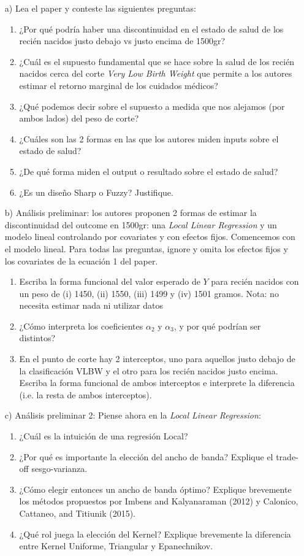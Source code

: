 \documentclass{article}
\begin{document}
\begin{enumerate}
\item[a)] Lea el paper y conteste las siguientes preguntas:
	\begin{enumerate}
	\item ¿Por qué podría haber una discontinuidad en el estado de salud de los recién nacidos justo debajo vs justo encima de 1500gr?
	\item ¿Cuál es el supuesto fundamental que se hace sobre la salud de los recién nacidos cerca del corte \textit{Very Low Birth Weight} que permite a los autores estimar el retorno marginal de los cuidados médicos?
	\item ¿Qué podemos decir sobre el supuesto a medida que nos alejamos (por ambos lados) del peso de corte?
	\item ¿Cuáles son las 2 formas en las que los autores miden inputs sobre el estado de salud?
	\item ¿De qué forma miden el output o resultado sobre el estado de salud?
	\item ¿Es un diseño Sharp o Fuzzy? Justifique. 
	\end{enumerate}
\item[b)] Análisis preliminar: los autores proponen 2 formas de estimar la discontinuidad del outcome en 1500gr: una \textit{Local Linear Regression} y un modelo lineal controlando por covariates y con efectos fijos. Comencemos con el modelo lineal. Para todas las preguntas, ignore y omita los efectos fijos y los covariates de la ecuación 1 del paper.
	\begin{enumerate}
	\item Escriba la forma funcional del valor esperado de $Y$ para recién nacidos con un peso de (i) 1450, (ii) 1550, (iii) 1499 y (iv) 1501 gramos. Nota: no necesita estimar nada ni utilizar datos
	\item ¿Cómo interpreta los coeficientes $\alpha_2$ y $\alpha_3$, y por qué podrían ser distintos?
	\item En el punto de corte hay 2 interceptos, uno para aquellos justo debajo de la clasificación VLBW y el otro para los recién nacidos justo encima. Escriba la forma funcional de ambos interceptos e interprete la diferencia (i.e. la resta de ambos interceptos).  
	\end{enumerate}

\item[c)] Análisis preliminar 2: Piense ahora en la \textit{Local Linear Regression}:
	\begin{enumerate}
	\item ¿Cuál es la intuición de una regresión Local?
	\item ¿Por qué es importante la elección del ancho de banda? Explique el trade-off sesgo-varianza.
	\item ¿Cómo elegir entonces un ancho de banda óptimo? Explique brevemente los métodos propuestos por Imbens and Kalyanaraman (2012) y Calonico, Cattaneo, and Titiunik (2015).
	\item ¿Qué rol juega la elección del Kernel? Explique brevemente la diferencia entre Kernel Uniforme, Triangular y Epanechnikov.
	\end{enumerate}


\end{enumerate}
\end{document}
